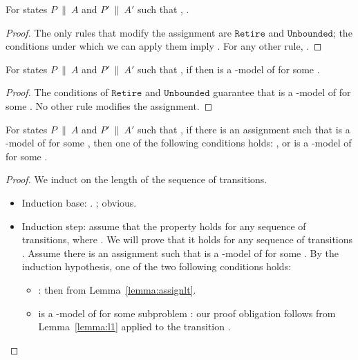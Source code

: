 \documentclass{llncs}
\newcommand{\tr}[1]{\ensuremath{\mathtt{#1}}}
\newcommand{\state}[2]{\ensuremath{#1\ \|\ #2}}
\newcommand{\pa}{\state{P}{A}}
\newcommand{\paprime}{\state{P'}{A'}}
\begin{document}
\begin{lemma}
  \label{lemma:assignlt}
  For states {\pa} and {\paprime} such that ,
  .
\end{lemma}
\begin{proof}
  The only rules that modify the assignment are \tr{Retire} and
  \tr{Unbounded}; the conditions under which we can apply them imply
  .  For any other rule, .
\end{proof}

\begin{lemma}
  \label{lemma:assigndiff}
  For states {\pa} and {\paprime} such that , if
   then  is a -model of  for
  some .
\end{lemma}
\begin{proof}
  The conditions of \tr{Retire} and \tr{Unbounded} guarantee that 
  is a -model of  for some . No
  other rule modifies the assignment.
\end{proof}

\begin{lemma}
  \label{lemma:l2}
  For states {\pa} and {\paprime} such that ,
  if there is an assignment  such that  is a -model of  for some , then one of the following
  conditions holds: , or  is a -model of
   for some .
\end{lemma}
\begin{proof}
  We induct on the length  of the sequence of transitions.

  \begin{itemize}
  \item Induction base: . ; obvious.
  \item Induction step: assume that the property holds for any
    sequence of  transitions, where . We will prove
    that it holds for any sequence of transitions .  Assume there is an assignment  such that
     is a -model of  for some
    . By the induction hypothesis, one of the
    two following conditions holds:
    \begin{itemize}
    \item : then  from
      Lemma~\ref{lemma:assignlt}.
    \item  is a -model of 
      for some subproblem :
      our proof obligation follows from Lemma~\ref{lemma:l1} applied
      to the transition .
    \end{itemize}
  \end{itemize}

\end{proof}
\end{document}
